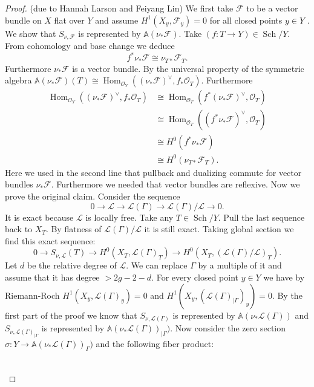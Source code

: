 \documentclass[12pt]{extarticle}
\theoremstyle{definition}
\numberwithin{theorem}{section}
\newcommand{\Aff}{\mathbb{A}}
\newcommand{\OO}{\mathcal{O}}
\newcommand{\cL}{\mathcal{L}}
\newcommand{\cF}{\mathcal{F}}
\newcommand{\op}{\operatorname}
\begin{document}
\begin{proof} (due to Hannah Larson and Feiyang Lin)
We first take $\cF$ to be a vector bundle on $X$ flat over $Y$ and assume $H^1(X_y,\cF_{y}) = 0$ for all closed points $y \in Y$ . We show that $S_{\nu,\cF}$ is represented by $\Aff(\nu_*\cF)$. Take $(f:T\to Y) \in \op{Sch}/Y$. From cohomology and base change we deduce 
\begin{equation}
f^*\nu_*\cF \cong \nu_{T*}\cF_T.
\end{equation} 
Furthermore $\nu_*\cF$ is a vector bundle. 
By the universal property of the symmetric algebra $\Aff(\nu_*\cF)(T) \cong \op{Hom}_{\OO_Y}((\nu_*\cF)^\vee,f_*\OO_T)$. Furthermore 
\begin{align*}
\op{Hom}_{\OO_Y}((\nu_*\cF)^\vee,f_*\OO_T) &\cong \op{Hom}_{\OO_T}(f^*(\nu_*\cF)^\vee,\OO_T)\\ &\cong \op{Hom}_{\OO_T}((f^*\nu_*\cF)^\vee,\OO_T) \\
&\cong H^0(f^*\nu_*\cF) \\
&\cong H^0(\nu_{T*}\cF_T).
\end{align*}
Here we used in the second line that pullback and dualizing commute for vector bundles $\nu_*\cF$. Furthermore we needed that vector bundles are reflexive.
Now we prove the original claim. Consider the sequence 
\begin{equation*}
0 \to \cL \to \cL(\Gamma) \to \cL(\Gamma)/\cL \to 0.
\end{equation*} 
It is exact because $\cL$ is locally free.
Take any $T \in \op{Sch}/Y$. Pull the last sequence back to $X_T$. By flatness of $\cL(\Gamma)/\cL$ it is still exact. Taking global section we find this exact sequence:
\begin{equation}\label{eq:kernel}
0 \to S_{\nu,\cL}(T) \to H^0(X_T,\cL(\Gamma)_T) \to H^0(X_T,\left(\cL(\Gamma)/\cL\right)_T).
\end{equation}
Let $d$ be the relative degree of $\cL$. We can replace $\Gamma$ by a multiple of it and assume that it has degree $> 2g-2-d$. For every closed point $y \in Y$ we have by Riemann-Roch $H^1(X_y,\cL(\Gamma)_y) = 0$ and $H^1(X_y,(\cL(\Gamma)_{|\Gamma})_y) = 0$. By the first part of the proof we know that $S_{\nu,\cL(\Gamma)}$ is represented by $\Aff(\nu_*\cL(\Gamma))$ and $S_{\nu,\cL(\Gamma)_{|\Gamma}}$ is represented by $\Aff(\nu_*\cL(\Gamma))_{|\Gamma})$. Now consider the zero section $\sigma: Y \to \Aff(\nu_*\cL(\Gamma))_{\Gamma})$ and the following fiber product:
\begin{equation}
\begin{tikzcd}

\end{tikzcd}
\end{equation}
\end{proof}
\end{document}
